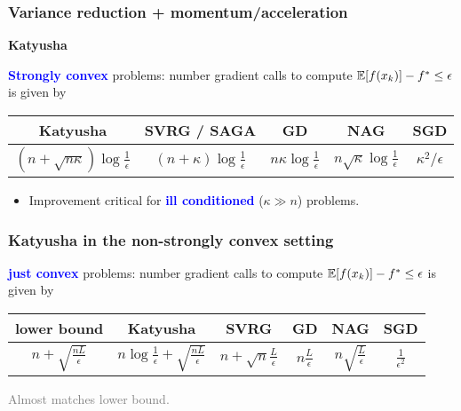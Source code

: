 \documentclass[aspectratio=149]{beamer}
\begin{document}
\begin{frame}
  \frametitle{Variance reduction + momentum/acceleration}
  \begin{block}{}
    \centering
    \textbf{Katyusha}
  \end{block}

  \textbf{\textcolor{blue}{Strongly convex}} problems: number gradient calls to compute $\mathbb{E} [f(x_k)] - f^* \le \epsilon$ is given by
  \begin{center}
  \begin{tabular}{c c c c c}
    Katyusha & SVRG / SAGA  & GD & NAG & SGD \\
    \midrule
    $(n + \sqrt{n \kappa}) \log \frac{1}{\epsilon}$ &$(n + \kappa) \log \frac{1}{\epsilon}$ & $n \kappa \log \frac{1}{\epsilon}$ & $n \sqrt{\kappa} \log \frac{1}{\epsilon}$ & $\kappa^2 / \epsilon$
  \end{tabular}
  \end{center}
  \vspace{1cm}
  \begin{itemize}
    \item Improvement critical for \textbf{\textcolor{blue}{ill conditioned}} ($\kappa \gg n$) problems.
  \end{itemize}


\end{frame}


\begin{frame}
  \frametitle{Katyusha in the non-strongly convex setting}
  \textbf{\textcolor{blue}{just convex}} problems: number gradient calls to compute $\mathbb{E} [f(x_k)] - f^* \le \epsilon$ is given by
  \begin{center}
  \begin{tabular}{c c c c c c}
    lower bound & Katyusha & SVRG & GD & NAG & SGD \\
    \midrule
    $n + \sqrt{\frac{n L}{\epsilon}}$ & $n \log \frac{1}{\epsilon} + \sqrt{\frac{n L}{\epsilon}}$ &$n + \sqrt{n}\frac{L}{\epsilon}$ & $n \frac{L}{\epsilon}$ & $n \sqrt{\frac{L}{\epsilon}}$ & $ \frac{1}{\epsilon^2}$
  \end{tabular}
  \end{center}
  \vspace{1cm}
  \textcolor{gray}{Almost matches lower bound.}

\end{frame}
\end{document}
